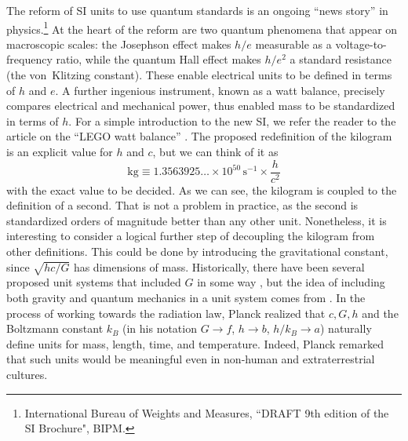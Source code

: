 \documentclass[]{rsos}
\begin{document}
The reform of SI units to use quantum standards is an ongoing ``news
story'' in physics.\footnote{International Bureau of Weights and
  Measures, ``DRAFT 9th edition of the SI Brochure", BIPM.}  At the
heart of the reform are two quantum phenomena that appear on
macroscopic scales: the Josephson effect makes $h/e$ measurable as a
voltage-to-frequency ratio, while the quantum Hall effect makes
$h/e^2$ a standard resistance (the von~Klitzing constant).  These
enable electrical units to be defined in terms of $h$ and $e$.  A
further ingenious instrument, known as a watt balance, precisely
compares electrical and mechanical power, thus enabled mass to be
standardized in terms of $h$.  For a simple introduction to the new
SI, we refer the reader to the article on the ``LEGO watt
balance'' \citep{Chao15}. The proposed redefinition of the kilogram is
an explicit value for $h$ and $c$, but we can think of it as
\begin{equation}
\mathrm{kg} \equiv 1.3563925\ldots \times 10^{50} \, \mathrm{s}^{-1}
                   \times \frac{h}{c^2}
\end{equation}
with the exact value to be decided.  As we can see, the kilogram is
coupled to the definition of a second.  That is not a problem in
practice, as the second is standardized orders of magnitude better
than any other unit.  Nonetheless, it is interesting to consider a
logical further step of decoupling the kilogram from other
definitions.  This could be done by introducing the gravitational
constant, since $\sqrt{hc/G}$ has dimensions of mass.  Historically,
there have been several proposed unit systems that included $G$ in
some way \citep[for a review, see][]{Tomilin1999}, but the idea of
including both gravity and quantum mechanics in a unit system comes
from \cite{Planck99}. In the process of working towards the
radiation law, Planck realized that $c,G,h$ and the Boltzmann constant
$k_B$ (in his notation $G\rightarrow f$, $h\rightarrow b$,
$h/k_B\rightarrow a$) naturally define units for mass, length, time,
and temperature.  Indeed, Planck remarked that such units would be
meaningful even in non-human and extraterrestrial cultures.
\end{document}
